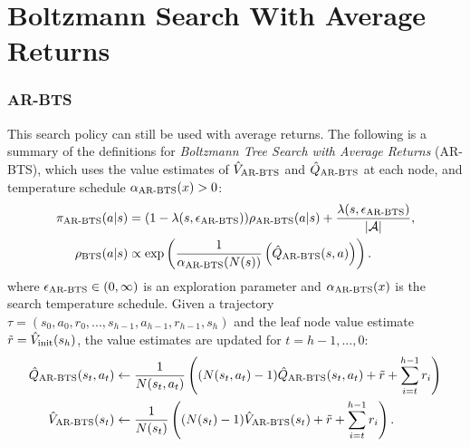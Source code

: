%

\chapter{\label{app:ar-algs}Boltzmann Search With Average Returns}





\subsection{AR-BTS} 
\label{app:arbts}


    This search policy can still be used with average returns. The following is a summary of the definitions for \textit{Boltzmann Tree Search with Average Returns} (AR-BTS), which uses the value estimates of ${\hat{V}_{{\textnormal{AR-BTS}}}}$ and ${\hat{Q}_{{\textnormal{AR-BTS}}}}$ at each node, and temperature schedule ${\alpha_{{\textnormal{AR-BTS}}}}(x) > 0$:
    \begin{align}
        {\pi_{{\textnormal{AR-BTS}}}}(a|s) &= (1-{\lambda(s,{\epsilon_{{\textnormal{AR-BTS}}}})}){\rho_{{\textnormal{AR-BTS}}}}(a|s) + \frac{{\lambda(s,{\epsilon_{{\textnormal{AR-BTS}}}})}}{|\mathcal{A}|}, 
                    \label{eq:arbts_search_policy} \\ 
        {\rho_{{\textnormal{BTS}}}}(a|s) &\propto \exp\left(\frac{1}{{\alpha_{{\textnormal{AR-BTS}}}}(N(s))}\left({\hat{Q}_{{\textnormal{AR-BTS}}}}(s,a)\right)\right).
                    \label{eq:arbts_value_policy}
    \end{align}
    where ${\epsilon_{{\textnormal{AR-BTS}}}} \in (0,\infty)$ is an exploration parameter and ${\alpha_{{\textnormal{AR-BTS}}}}(x)$ is the search temperature schedule. Given a trajectory $\tau=(s_0,a_0,r_0,...,s_{h-1},a_{h-1},r_{h-1},s_h)$ and the leaf node value estimate $\tilde{r} = {\hat{V}_{\textnormal{init}}}(s_h)$, the value estimates are updated for $t=h-1,...,0$:
    \begin{align}
        {\hat{Q}_{{\textnormal{AR-BTS}}}}(s_t,a_t) &\leftarrow 
            \frac{1}{N(s_t,a_t)} \left( (N(s_t,a_t)-1) {\hat{Q}_{{\textnormal{AR-BTS}}}}(s_t,a_t) 
                + \tilde{r} + \sum_{i=t}^{h-1} r_i \right) \label{eq:4:arbts_backup_q} \\
        {\hat{V}_{{\textnormal{AR-BTS}}}}(s_t) &\leftarrow 
            \frac{1}{N(s_t)} \left( (N(s_t)-1) {\hat{V}_{{\textnormal{AR-BTS}}}}(s_t) 
                + \tilde{r} + \sum_{i=t}^{h-1} r_i \right). \label{eq:4:arbsts_backup_v} 
    \end{align}

